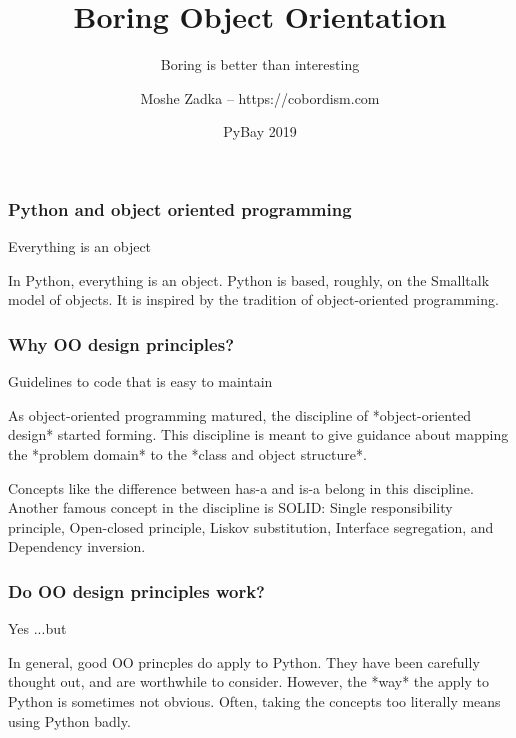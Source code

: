 \usepackage{listings}
\usepackage{textcomp}
\usepackage{fancyvrb}

\title{Boring Object Orientation}
\subtitle{Boring is better than interesting}
\author{Moshe Zadka -- https://cobordism.com}
\date{PyBay 2019}


\begin{titlepage}
\maketitle
\end{titlepage}

\frame{\titlepage}

\begin{frame}[fragile]
\frametitle{Python and object oriented programming}

Everything is an object
\end{frame}

In Python,
everything is an object.
Python is based,
roughly,
on the Smalltalk model of objects.
It is inspired by the tradition of object-oriented programming.

\begin{frame}[fragile]
\frametitle{Why OO design principles?}

Guidelines to code that is easy to maintain
\end{frame}

As object-oriented programming matured,
the discipline of
*object-oriented design* started forming.
This discipline is meant to give guidance
about mapping the
*problem domain*
to the
*class and object structure*.

Concepts like the difference between
has-a
and
is-a
belong in this discipline.
Another famous concept in the discipline
is
SOLID:
Single responsibility principle,
Open-closed principle,
Liskov substitution,
Interface segregation,
and Dependency inversion.

\begin{frame}[fragile]
\frametitle{Do OO design principles work?}

Yes
\pause
...but
\end{frame}

In general,
good OO princples do apply to Python.
They have been carefully thought out,
and are worthwhile to consider.
However,
the
*way*
the apply to Python is sometimes not obvious.
Often,
taking the concepts too literally means
using Python badly.


